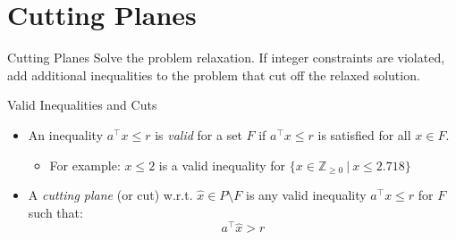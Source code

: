 \section{Cutting Planes}

\begin{frame}{Cutting Planes}
Solve the problem relaxation. If integer constraints are violated, add additional inequalities to the problem that cut off the relaxed solution.

\end{frame}

\begin{frame}{Valid Inequalities and Cuts}
\begin{itemize}[<+->]
	\item An inequality $a^\top x \leq r$ is \emph{valid} for a set $F$ if $a^\top x \leq r$ is satisfied for all $x \in F$.
	\begin{itemize}
		\item For example: $x \leq 2$ is a valid inequality for $\{x \in \mathbb{Z}_{\geq 0} \:\vert\: x \leq 2.718 \}$
	\end{itemize}
	\item A \emph{cutting plane} (or cut) w.r.t. $\hat{x} \in P \setminus F$ is any valid inequality $a^\top x \leq r$ for $F$ such that:
	\begin{equation*}
		a^\top \hat{x} > r
	\end{equation*}
\end{itemize}

\end{frame}

